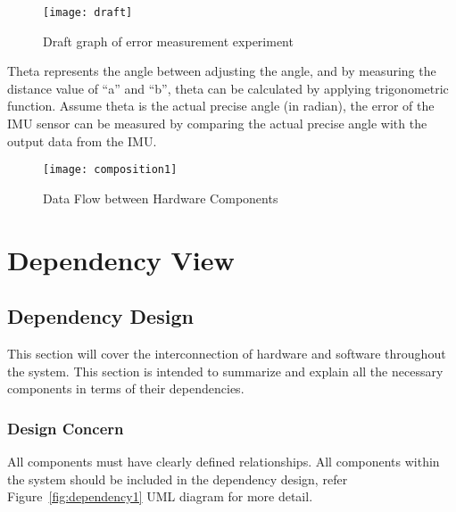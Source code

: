 			\begin{figure}
				\centering
			 		\caption{Draft graph of error measurement experiment}
			      	\texttt{[image: draft]}
			    \label{fig:draft}
			\end{figure}

			Theta represents the angle between adjusting the angle, and by measuring the distance value of “a” and “b”, theta can be calculated by applying trigonometric function. Assume theta is the actual precise angle (in radian), the error of the IMU sensor can be measured by comparing the actual precise angle with the output data from the IMU.

		\begin{figure}
			\centering
		 		\caption{Data Flow between Hardware Components}
		      	\texttt{[image: composition1]}
		    \label{fig:composition1}
		\end{figure}

\section{Dependency View}
	\subsection{Dependency Design}
	This section will cover the interconnection of hardware and software throughout the system. This section is intended to summarize and explain all the necessary components in terms of their dependencies.\\

		\subsubsection{Design Concern}
		All components must have clearly defined relationships. All components within the system should be included in the dependency design, refer Figure~\ref{fig:dependency1} UML diagram for more detail.\\

